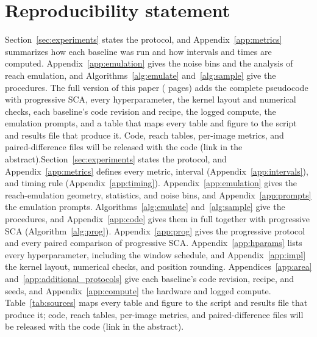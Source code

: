 \documentclass{article} %
\newcommand{\shortalt}[2]{\ifshortversion#2\else#1\fi}
\newcommand{\sca}{SCA}
\theoremstyle{remark}
\begin{document}
\section*{Reproducibility statement}
\shortalt{Section~\ref{sec:experiments} states the protocol, and Appendix~\ref{app:metrics} defines every metric, interval (Appendix~\ref{app:intervals}), and timing rule (Appendix~\ref{app:timing}). Appendix~\ref{app:emulation} gives the reach-emulation geometry, statistics, and noise bins, and Appendix~\ref{app:prompts} the emulation prompts. Algorithms~\ref{alg:emulate} and~\ref{alg:sample} give the procedures, and Appendix~\ref{app:code} gives them in full together with progressive \sca{} (Algorithm~\ref{alg:prog}). Appendix~\ref{app:prog} gives the progressive protocol and every paired comparison of progressive \sca{}. Appendix~\ref{app:hparams} lists every hyperparameter, including the window schedule, and Appendix~\ref{app:impl} the kernel layout, numerical checks, and position rounding. Appendices~\ref{app:area} and~\ref{app:additional_protocols} give each baseline's code revision, recipe, and seeds, and Appendix~\ref{app:compute} the hardware and logged compute. Table~\ref{tab:sources} maps every table and figure to the script and results file that produce it; code, reach tables, per-image metrics, and paired-difference files will be released with the code (link in the abstract).}{Section~\ref{sec:experiments} states the protocol, and Appendix~\ref{app:metrics} summarizes how each baseline was run and how intervals and times are computed. Appendix~\ref{app:emulation} gives the noise bins and the analysis of reach emulation, and Algorithms~\ref{alg:emulate} and~\ref{alg:sample} give the procedures. The full version of this paper (\fullversionpages{} pages) adds the complete pseudocode with progressive \sca{}, every hyperparameter, the kernel layout and numerical checks, each baseline's code revision and recipe, the logged compute, the emulation prompts, and a table that maps every table and figure to the script and results file that produce it. Code, reach tables, per-image metrics, and paired-difference files will be released with the code (link in the abstract).}

\renewcommand{\topfraction}{0.95}





\end{document}
